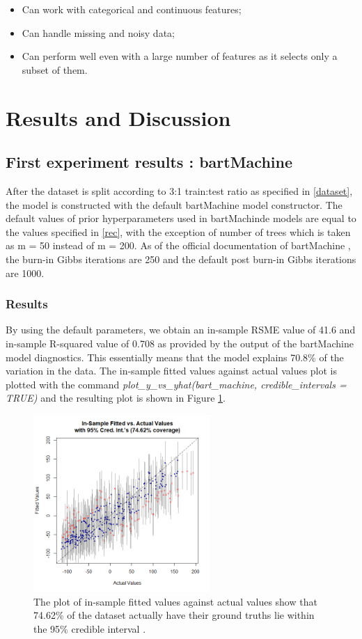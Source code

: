 \documentclass{usiinftr}
\begin{document}
\begin{itemize}
\item Can work with categorical and continuous features;
\item Can handle missing and noisy data;
\item Can perform well even with a large number of features as it selects only a subset of them. 
\end{itemize} 



\section{Results and Discussion}
\subsection{First experiment results : bartMachine}
After the dataset is split according to 3:1 train:test ratio as specified in \ref{dataset}, the model is constructed with the default bartMachine model constructor. The default values of prior hyperparameters used in bartMachinde models are equal to the values specified in \ref{rec}, with the exception of number of trees which is taken as m = 50 instead of m = 200. As of the official documentation of bartMachine \cite{}, the burn-in Gibbs iterations are 250 and the default post burn-in Gibbs iterations are 1000. 

\subsubsection{Results}
By using the default parameters, we obtain an in-sample RSME value of 41.6 and in-sample R-squared value of 0.708 as provided by the output of the bartMachine model diagnostics. This essentially means that the model explains 70.8\% of the variation in the data. The in-sample fitted values against actual values plot is plotted with the command \textit{plot\_y\_vs\_yhat(bart\_machine, credible\_intervals = TRUE)} and the resulting plot is shown in Figure \ref{CI}.


\begin{figure}[h!] 
\centering
\includegraphics[width=0.6\textwidth]{images/CI.png}
\caption{The plot of in-sample fitted values against actual values show that 74.62\% of the dataset actually have their ground truths lie within the 95\% credible interval .}
\label{CI}
\end{figure}
\end{document}
